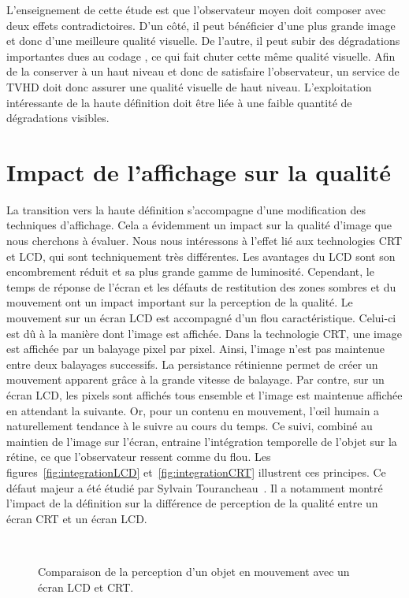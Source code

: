 L'enseignement de cette étude est que l'observateur moyen doit composer avec deux effets contradictoires. D'un côté, il peut bénéficier d'une plus grande image et donc d'une meilleure qualité visuelle. De l'autre, il peut subir des dégradations importantes dues au codage \avc, ce qui fait chuter cette même qualité visuelle. Afin de la conserver à un haut niveau et donc de satisfaire l'observateur, un service de TVHD doit donc assurer une qualité visuelle de haut niveau. L'exploitation intéressante de la haute définition doit être liée à une faible quantité de dégradations visibles.


\section{Impact de l'affichage sur la qualité} \label{sec:Études_Impact_Affichage_Qualité}
La transition vers la haute définition s'accompagne d'une modification des techniques d'affichage. Cela a évidemment un impact sur la qualité d'image que nous cherchons à évaluer. Nous nous intéressons à l'effet lié aux technologies CRT et LCD, qui sont techniquement très différentes. Les avantages du LCD sont son encombrement réduit et sa plus grande gamme de luminosité. Cependant, le temps de réponse de l'écran et les défauts de restitution des zones sombres et du mouvement ont un impact important sur la perception de la qualité. Le mouvement sur un écran LCD est accompagné d'un flou caractéristique. Celui-ci est dû à la manière dont l'image est affichée. Dans la technologie CRT, une image est affichée par un balayage pixel par pixel. Ainsi, l'image n'est pas maintenue entre deux balayages successifs. La persistance rétinienne permet de créer un mouvement apparent grâce à la grande vitesse de balayage. Par contre,  sur un écran LCD, les pixels sont affichés tous ensemble et l'image est maintenue affichée en attendant la suivante. Or, pour un contenu en mouvement, l'\oe il humain a naturellement tendance à le suivre au cours du temps. Ce suivi, combiné au maintien de l'image sur l'écran, entraine l'intégration temporelle de l'objet sur la rétine, ce que l'observateur ressent comme du flou. Les figures~\ref{fig:integrationLCD} et~\ref{fig:integrationCRT} illustrent ces principes. Ce défaut majeur a été étudié par Sylvain Tourancheau~\cite{tourancheau-vpqm2007, tourancheau-icip2007}. Il a notamment montré l'impact de la définition sur la différence de perception de la qualité entre un écran CRT et un écran LCD.

\begin{figure}[htbp]
	\centering
	\hfill
	\\
	\caption{Comparaison de la perception d'un objet en mouvement avec un écran LCD et CRT.}
\end{figure}

